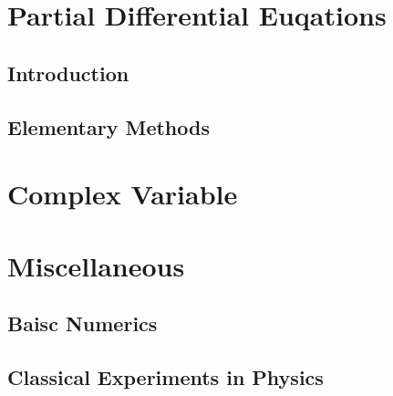 \documentclass{article}
\begin{document}
\section{Partial Differential Euqations}

\subsection{Introduction}



\subsection{Elementary Methods}







\section{Complex Variable}





\section{Miscellaneous}

\subsection{Baisc Numerics}



\subsection{Classical Experiments in Physics}


\end{document}
